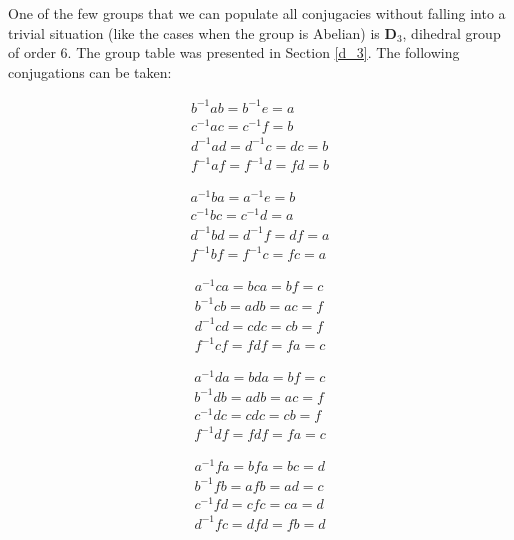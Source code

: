 \begin{example}
One of the few groups that we can populate all conjugacies without falling into a trivial situation (like the cases when the group is Abelian) is $\textbf{D}_3$, dihedral group of order 6.
 The group table was presented in Section \ref{d_3}. The following conjugations can be taken:
 \cite{rosen_symmetry_1995}
\begin{table}[H]
\center
\begin{minipage}[b]{0.49\linewidth}
\center
 \begin{align}
\nonumber  b^{-1}ab = b^{-1}e = a \\
\nonumber  c^{-1}ac = c^{-1}f = b \\
 d^{-1}ad = d^{-1}c = dc = b\\ 
\nonumber  f^{-1}af = f^{-1}d = fd = b
 \end{align}
\end{minipage}
\begin{minipage}[b]{0.49\linewidth}
 \begin{align}
\nonumber  a^{-1}ba = a^{-1}e = b \\
\nonumber  c^{-1}bc = c^{-1}d = a \\
 d^{-1}bd = d^{-1}f = df = a\\ 
\nonumber  f^{-1}bf = f^{-1}c = fc = a
 \end{align}
\end{minipage}
\end{table}
\begin{table}[H]
\begin{minipage}[b]{0.49\linewidth}
 \begin{align}
\nonumber  a^{-1}ca = bca = bf = c \\
\nonumber  b^{-1}cb = adb = ac = f \\
 d^{-1}cd = cdc = cb = f \\
\nonumber  f^{-1}cf = fdf = fa = c 
 \end{align}
\end{minipage}
\begin{minipage}[b]{0.49\linewidth}
 \begin{align}
\nonumber  a^{-1}da = bda = bf = c \\
\nonumber  b^{-1}db = adb = ac = f \\
 c^{-1}dc = cdc = cb = f \\
\nonumber  f^{-1}df = fdf = fa = c 
 \end{align}
\end{minipage}
\end{table}
\begin{table}[H]
\center
\begin{minipage}[b]{0.49\linewidth}
\center
 \begin{align}
\nonumber  a^{-1}fa = bfa = bc = d \\
\nonumber  b^{-1}fb = afb = ad = c \\
 c^{-1}fd = cfc = ca = d \\
\nonumber  d^{-1}fc = dfd = fb = d 
 \end{align}
\end{minipage}
\end{table}


\end{example}
